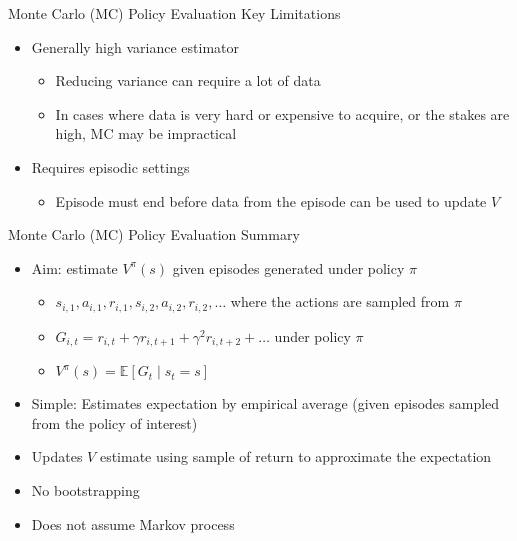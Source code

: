 \documentclass[aspectratio=169]{../latex_main/tntbeamer}  %
\begin{document}
\begin{frame}[c]{Monte Carlo (MC) Policy Evaluation Key Limitations}
	
	\begin{itemize}
		\item Generally high variance estimator
		\begin{itemize}
			\item Reducing variance can require a lot of data
			\item In cases where data is very hard or expensive to acquire, or the stakes are
			high, MC may be impractical
		\end{itemize}
		\medskip
		\pause
		\item Requires episodic settings
		\begin{itemize}
			\item Episode must end before data from the episode can be used to update $V$

		\end{itemize}
		
	\end{itemize}
	
\end{frame}
\begin{frame}[c]{Monte Carlo (MC) Policy Evaluation Summary}
	
	\begin{itemize}
		\item Aim: estimate $V^\pi(s)$ given episodes generated under policy $\pi$
		\begin{itemize}
			\item $s_{i,1}, a_{i,1}, r_{i,1}, s_{i,2}, a_{i,2}, r_{i,2}, \ldots$ where the actions are sampled from $\pi$
			\item $G_{i,t} = r_{i,t} + \gamma r_{i,t+1} + \gamma^2 r_{i,t+2} + \ldots$ under policy $\pi$
			\item $V^\pi (s) = \mathbb{E}[G_t \mid s_t = s]$
		\end{itemize}
		\item Simple: Estimates expectation by empirical average (given episodes sampled from the policy of interest)
		\item Updates $V$ estimate using sample of return to approximate the expectation
		\item No bootstrapping
		\item Does not assume Markov process
	\end{itemize}
	
\end{frame}

\end{document}
